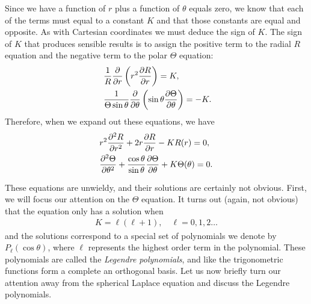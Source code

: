 Since we have a function of $r$ plus a function of $\theta$ equals zero, we know that each of the terms must equal to a constant $K$ and that those constants are equal and opposite. As with Cartesian coordinates we must deduce the sign of $K$. The sign of $K$ that produces sensible results is to assign the positive term to the radial $R$ equation and the negative term to the polar $\Theta$ equation:
\begin{subequations}
\begin{align}
  &\frac{1}{R} \frac{ \partial {} }{ \partial {r} } \left( r^2 \frac{ \partial {R} }{ \partial {r} } \right) = K, \\\
  &\frac{1}{\Theta \sin \theta } \frac{ \partial {} }{ \partial {\theta} } \left( \sin \theta \frac{ \partial {\Theta} }{ \partial {\theta} } \right) = -K .
\end{align}
\end{subequations}
Therefore, when we expand out these equations, we have
\begin{subequations}
\begin{align}
  &r^2 \frac{ \partial^2 {R} }{ \partial {r}^2 } + 2 r \frac{ \partial {R} }{ \partial {r} } - K R(r) = 0, \\
  &\frac{ \partial^2 {\Theta} }{ \partial {\theta}^2 } + \frac{ \cos \theta }{ \sin \theta } \frac{ \partial {\Theta} }{ \partial {\theta} } + K \Theta(\theta) = 0.
\end{align}
\end{subequations}


These equations are unwieldy, and their solutions are certainly not obvious. First, we will focus our attention on the $\Theta$ equation. It turns out (again, not obvious) that the equation only has a solution when 
\begin{align}
  K = \ell ( \ell + 1 ), \quad \ell = 0, 1, 2 \ldots
\end{align}
and the solutions correspond to a special set of polynomials we denote by $P_\ell(\cos \theta)$, where $\ell$ represents the highest order term in the polynomial. These polynomials are called the \emph{Legendre polynomials}, and like the trigonometric functions form a complete an orthogonal basis. Let us now briefly turn our attention away from the spherical Laplace equation and discuss the Legendre polynomials.

